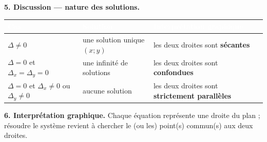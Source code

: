 \documentclass[a4paper,11pt]{article}
\begin{document}
\begin{tcolorbox}
\textbf{5. Discussion --- nature des solutions.}
\begin{center}
\begin{tabularx}{0.97\linewidth}{|p{3.4cm}|p{3.5cm}|X|}
\hline
\rowcolor{entete}\textcolor{white}{\textbf{Cas}} &
\textcolor{white}{\textbf{Solution}} &
\textcolor{white}{\textbf{Interprétation graphique}}\\
\hline
$\Delta\neq0$ & une solution unique $(x;y)$ & les deux droites sont \textbf{sécantes} \\
\hline
$\Delta=0$ et $\Delta_x=\Delta_y=0$ & une infinité de solutions & les deux droites sont \textbf{confondues} \\
\hline
$\Delta=0$ et $\Delta_x\neq0$ ou $\Delta_y\neq0$ & aucune solution & les deux droites sont \textbf{strictement parallèles} \\
\hline
\end{tabularx}
\end{center}

\textbf{6. Interprétation graphique.}
Chaque équation représente une droite du plan ; résoudre le système revient à
chercher le (ou les) point(s) commun(s) aux deux droites.
\begin{center}
\end{center}


\end{tcolorbox}
\end{document}
